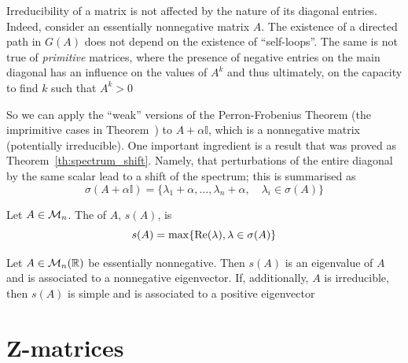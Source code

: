 \documentclass[aspectratio=169]{beamer}
\begin{document}
\begin{frame}
\begin{remark}
Irreducibility of a matrix is not affected by the nature of its diagonal entries.  Indeed, consider an essentially nonnegative matrix $A$. The existence of a directed path in $G(A)$ does not depend on the existence of ``self-loops''. The same is not true of \emph{primitive} matrices, where the presence of negative entries on the main diagonal has an influence on the values of $A^k$ and thus ultimately, on the capacity to find $k$ such that $A^k>0$
\end{remark}
\end{frame}


\begin{frame}
So we can apply the ``weak'' versions of the Perron-Frobenius Theorem (the imprimitive cases in Theorem~) to $A+\alpha \mathbb{I}$, which is a nonnegative matrix (potentially irreducible). One important ingredient is a result that was proved as Theorem~\ref{th:spectrum_shift}. Namely, that perturbations of the entire diagonal by the same scalar lead to a shift of the spectrum; this is summarised as
\[
\sigma(A+\alpha \mathbb{I})=\{ \lambda_1+\alpha, \dots, \lambda_n+\alpha,\quad \lambda_i\in \sigma(A)\}
\]
\end{frame}



\begin{frame}
\begin{definition}
Let $A\in \mathcal{M}_n$. The  of $A$, $s(A)$, is 
\[
s(A)= \max\{\operatorname{Re}(\lambda), \lambda\in \sigma(A)\}
\]
\end{definition}
\vfill
\begin{theorem}\label{th:PF_essentially_nonneg}
Let $A\in\mathcal{M}_n(\mathbb{R})$ be essentially nonnegative. Then $s(A)$ is an eigenvalue of $A$ and is associated to a nonnegative eigenvector. If, additionally, $A$ is irreducible, then $s(A)$ is simple and is associated to a positive eigenvector
\end{theorem}
\end{frame}



\section{Z-matrices}
\label{sec:Z_matrices}
\end{document}
